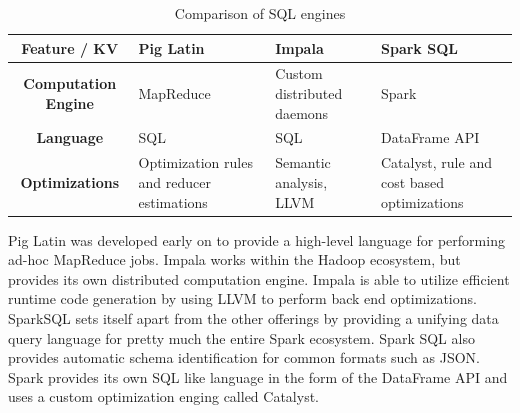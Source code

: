 \documentclass[]{article}
\begin{document}
\begin{table}
    \begin{adjustbox}{center} 
        \begin{tabulary}{1.7\linewidth}{|c|L|L|L|}
            \hline 
            \textbf{Feature / KV} & \textbf{Pig Latin} & \textbf{Impala} & \textbf{Spark SQL} \\
            \hline 
            \textbf{Computation Engine} & MapReduce & Custom distributed daemons & Spark \\ 
            \hline 
            \textbf{Language} & SQL & SQL & DataFrame API\\ 
            \hline 
            \textbf{Optimizations} & Optimization rules and reducer estimations & Semantic analysis, LLVM & Catalyst, rule and cost based optimizations \\
            \hline
        \end{tabulary} 
    \end{adjustbox}
    \caption{Comparison of SQL engines}
    \label{table:sql-engine-comparison}
\end{table}

Pig Latin was developed early on to provide a high-level language for performing ad-hoc MapReduce jobs. Impala works within the Hadoop ecosystem, but provides its own distributed computation engine. Impala is able to utilize efficient runtime code generation by using LLVM to perform back end optimizations. SparkSQL sets itself apart from the other offerings by providing a unifying data query language for pretty much the entire Spark ecosystem. Spark SQL also provides automatic schema identification for common formats such as JSON. Spark provides its own SQL like language in the form of the DataFrame API and uses a custom optimization enging called Catalyst.
\end{document}
